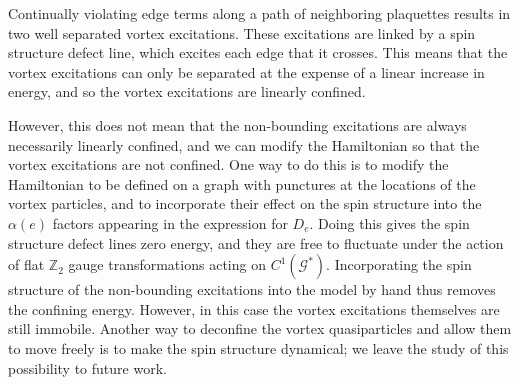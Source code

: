 \documentclass[12pt,a4paper]{article}
\newcommand{\mcg}{\mathcal{G}}
\newcommand{\zt}{\mathbb{Z}_2}
\begin{document}
Continually violating edge terms along a path of neighboring plaquettes results in two well separated vortex excitations.
These excitations are linked by a spin structure defect line, which excites each edge that it crosses. 
This means that the vortex excitations can only be separated
at the expense of a linear increase in energy, and so the vortex excitations are linearly confined. 

However, this does not mean that the non-bounding excitations are always necessarily linearly confined, and we can modify the Hamiltonian so that the vortex excitations are not confined.
One way to do this is to modify the Hamiltonian to be defined on a graph with punctures at the locations of the vortex particles, and to incorporate their effect on the spin structure into the $\alpha(e)$ factors appearing in the expression for $D_e$. 
Doing this gives the spin structure defect lines zero energy, and they are free to fluctuate under the action of flat $\zt$ gauge transformations acting on $C^1(\mcg^*)$. 
Incorporating the spin structure of the non-bounding excitations into the model by hand thus removes the confining energy. 
However, in this case the vortex excitations themselves are still immobile. 
Another way to deconfine the vortex quasiparticles and allow them to move freely is to make the spin structure dynamical; we leave the study of this possibility to future work. 
\end{document}
